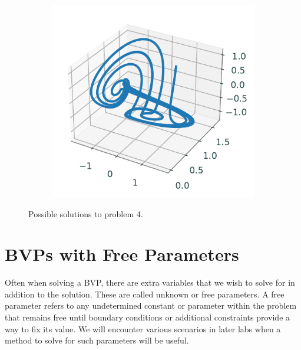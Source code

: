 \begin{figure}[H]
\begin{subfigure}[b]{.3\textwidth}
    \end{subfigure}
    \begin{subfigure}[b]{.3\textwidth}
        \centering
        \includegraphics[width = \textwidth ]{figures/problem43.pdf}
    \end{subfigure}
    \caption{Possible solutions to problem 4.}
    \label{fig:bvpintro:bvp4}
\end{figure}


\section*{BVPs with Free Parameters}

Often when solving a BVP, there are extra variables that we wish to solve for in addition to the solution. 
These are called unknown or free parameters. 
A free parameter refers to any undetermined constant or parameter within the problem that remains free until boundary conditions or additional constraints provide a way to fix its value. 
We will encounter various scenarios in later labs when a method to solve for such parameters will be useful. 

